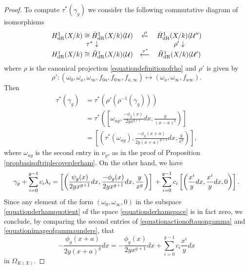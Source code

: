 \begin{proof}
    To compute $\tau^*(\gamma_g)$ we consider the following commutative diagram of isomorphisms
        \[
        \begin{array}{ccc}
        H_{\text {dR}}^1(X/k) \cong \check{H}_{\text {dR}}^1(X/k)({\mathcal U})  & \xleftarrow{\rho} & \check{H}_{\text {dR}}^1(X/k)({\mathcal U}'')  \\
                \tau^*\downarrow & ~ & \rho'\downarrow  \\
        H_{\text {dR}}^1(X/k) \cong \check{H}_{\text {dR}}^1(X/k)({\mathcal U})  & \xleftarrow{\tau^*} & \check{H}_{\text {dR}}^1(X/k)({\mathcal U}')
        \end{array}
        \]
        where $\rho$ is the canonical projection \eqref{equationdefinitionofrho} and $\rho'$ is given by
            \[
            \rho' \colon (\omega_0, \omega_a, \omega_\infty, f_{0 a}, f_{0 \infty}, f_{a, \infty}) \mapsto (\omega_a, \omega_\infty, f_{a \infty}).
            \]
    Then 
        \begin{equation}\label{equationactionoftauongamma}
        \begin{split}
        \tau^*(\gamma_g) & = \tau^*(\rho'(\rho^{-1}(\gamma_g))) \\  
        & = \tau^*\left( \left[ \omega_{a g}, \frac{- \phi_g(x)}{2yx^{g+1}} dx, \frac{y}{(x-a)^g} \right) \right] \\
        & = \left[ \left( \tau^*(\omega_{a g}) , \frac{-\phi_g(x+a)}{2y(x+a)^{g+1}}dx, \frac{y}{x^g} \right) \right],
        \end{split}
        \end{equation}
    where $\omega_{a g}$ is the second entry in $\nu_g$, as in the proof of Proposition \ref{propbasisoftriplecoverderham}.
    On the other hand, we have 
        \begin{equation}\label{equationimageofgammaunders}
        \gamma_g + \sum_{i=0}^{g-1} c_i \lambda_i = \left[ \left( \frac{\psi_g(x)}{2yx^{g+1}}dx, \frac{-\phi_g(x)}{2yx^{g+1}}dx, \frac{y}{x^g} \right) \right] \\ + \sum_{i=0}^{g-1} c_i \left[ \left( \frac{x^i}{y}dx, \frac{x^i}{y}dx, 0 \right) \right].
        \end{equation}
    Since any element of the form $(\omega_0, \omega_\infty, 0)$ in the subspace \eqref{equationderhamquotient} of the space \eqref{equationderhamspace} is in fact zero, we conclude, by comparing the second entries of \eqref{equationactionoftauongamma} and \eqref{equationimageofgammaunders}, that
        \[
        - \frac{\phi_g(x+a)}{2y(x+a)^g} dx = -\frac{\phi_g(x)}{2yx^{g+1}}dx + \sum_{i = 0}^{g-1} c_i \frac{x^i}{y}dx
        \]
    in $\Omega_{K(X)}$.
    

\end{proof}

